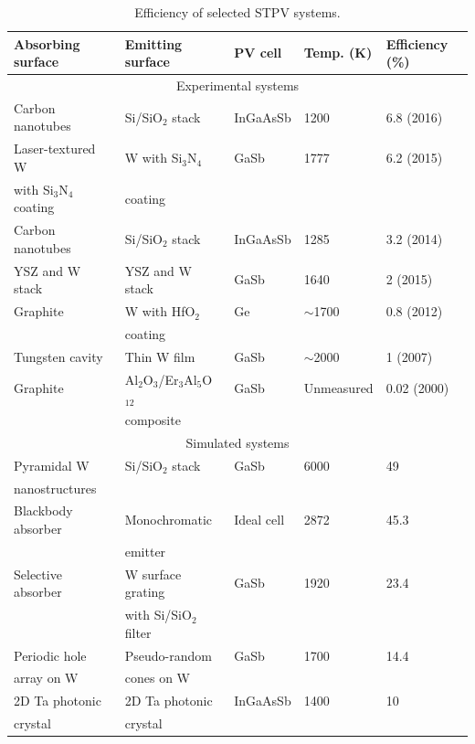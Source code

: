 \documentclass[review]{elsarticle}
\begin{document}
\begin{table}
	\caption{Efficiency of selected STPV systems.}
	\label{STPV_sys_table}
	\begin{center}
		\begin{tabular}{|lllll|}
		\hline
		Absorbing surface & Emitting surface & PV cell & Temp. (K) & Efficiency (\%)\\
		\hline
		\multicolumn{5}{c}{Experimental systems} \\
		\hline
		Carbon nanotubes	& Si/SiO$_2$ stack	& InGaAsSb & 1200 &	6.8 \cite{nnnNature} (2016)\\
		Laser-textured W & W with Si$_3$N$_4$ & GaSb & 1777& 6.2 \cite{me3} (2015)\\
		with Si$_3$N$_4$ coating & coating &&&\\
		Carbon nanotubes & Si/SiO$_2$ stack & InGaAsSb & 1285 & 3.2 \cite{MIT_paper}  (2014)\\
		YSZ and W stack	& YSZ and W stack	& GaSb & 1640 &	2 \cite{SKY_JPE_2015} (2015)\\
		Graphite & W with HfO$_2$ & Ge & $\sim$1700 & 0.8 \cite{exp_madrid}  (2012)\\
		& coating &&&\\
		Tungsten cavity & Thin W film & GaSb & $\sim$2000 & 1 \cite{exp_russia} (2007)\\
		Graphite & {A}l$_2${O}$_3$/{E}r$_3${A}l$_5${O}$_{12}$ & GaSb & Unmeasured & 0.02 \cite{exp_tokyo} (2000)\\
		& composite &&&\\
		\hline
		\multicolumn{5}{c}{Simulated systems} \\
		\hline
		Pyramidal W & Si/SiO$_2$ stack & GaSb & 6000 & 49~\cite{RF_OptExp_2009}\\
		nanostructures &&&&\\
		Blackbody absorber	& Monochromatic & Ideal cell	& 2872 & 45.3~\cite{global_opt}\\
		& emitter &&&\\
		Selective absorber	& W surface grating & GaSb & 1920 & 23.4~\cite{paper2_ref6} \\
		& with Si/SiO$_2$ filter & & &\\
		Periodic hole &	Pseudo-random & GaSb	& 1700 &	14.4~\cite{me_thesis}\\	
		array on W	& cones on W&&&\\	
		2D Ta photonic & 2D Ta photonic & InGaAsSb & 1400 & 10~\cite{NYL_SEMSC_2014}\\
		crystal& crystal &&&\\
		\hline
		\end{tabular}
	\end{center}
\end{table}
\end{document}
